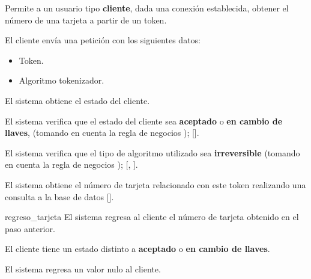 %
%

{
  Permite a un usuario tipo \textbf{cliente}, dada una conexión establecida, obtener el
  número de una tarjeta a partir de un token.

  \begin{trayectoriaPrincipal}

    \item El cliente envía una petición con los siguientes datos:
      \begin{itemize}
        \item Token.
        \item Algoritmo tokenizador.
      \end{itemize}

    \item El sistema obtiene el estado del cliente.

    \item El sistema verifica que el estado del cliente sea \textbf{aceptado}
      o \textbf{en cambio de llaves}, (tomando en cuenta la regla de negocios
      );
      [].

    \item El sistema verifica que el tipo de algoritmo utilizado sea
      \textbf{irreversible} (tomando en cuenta la regla de negocios
      );
      [,
      ].

    \item El sistema obtiene el número de tarjeta relacionado con este token
      realizando una consulta a la base de datos
      [].

    \item [regreso_tarjeta] El sistema regresa al cliente el número de tarjeta
      obtenido en el paso anterior.

  \end{trayectoriaPrincipal}

  \begin{trayectoriaAlternativa}
    {El cliente tiene un estado distinto a \textbf{aceptado} o
      \textbf{en cambio de llaves}.}

    \item El sistema regresa un valor nulo al cliente.


\end{trayectoriaAlternativa}}
